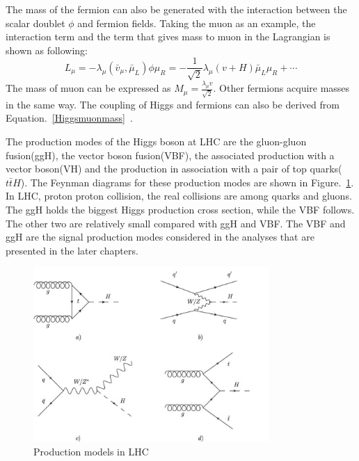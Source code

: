 The mass of the fermion can also be generated with the interaction between the scalar doublet $\phi$ and fermion fields. Taking the muon as an example, the interaction term and the term that gives mass to muon in the Lagrangian is shown as following:
\begin{equation}\label{Higgsmuonmass}
L_{\mu}=-\lambda_{\mu}(\bar{v}_{\mu},\bar{\mu}_{L})\phi\mu_{R}
            =-\frac{1}{\sqrt{2}}\lambda_{\mu}(v+H)\bar{\mu}_{L}\mu_{R}+ \cdots
\end{equation}
The mass of muon can be expressed as $M_{\mu}=\frac{\lambda_{\mu}v}{\sqrt{2}}$. Other fermions acquire masses in the same way. The coupling of Higgs and fermions can also be derived from Equation.~\ref{Higgsmuonmass}~\cite{DJOUADI20081}. 

The production modes of the Higgs boson at LHC are the gluon-gluon fusion(ggH), the vector boson fusion(VBF), the associated production with a vector boson(VH) and the production in association with a pair of top quarks($t\bar{t}H$). The Feynman diagrams for these production modes are shown in Figure.~\ref{fig:SM_H_production}. In LHC, proton proton collision, the real collisions are among quarks and gluons. The ggH holds the biggest Higgs production cross section, while the VBF follows. The other two are relatively small compared with ggH and VBF. The VBF and ggH are the signal production modes considered in the analyses that are presented in the later chapters. 

\begin{figure}[htbp] 
\centering
\includegraphics[width=0.8\textwidth]{chapter2/Higgs_production.jpg}
\caption{Production models in LHC}%
\label{fig:SM_H_production}
\end{figure}

